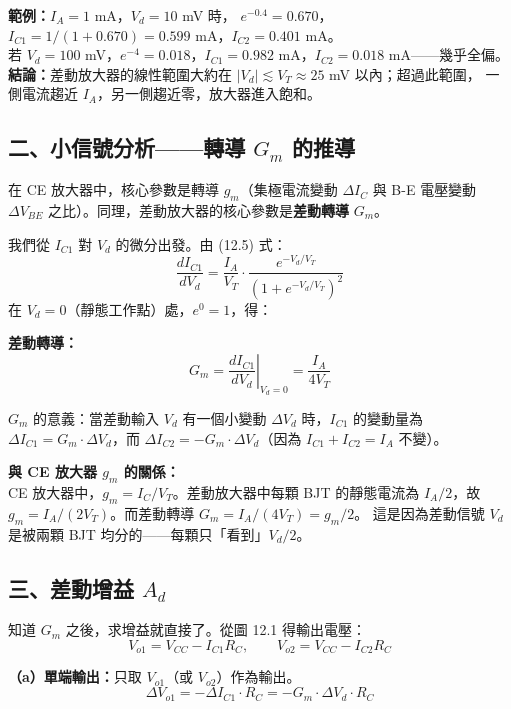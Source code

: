 \documentclass[12pt]{article}
\begin{document}
\noindent\textbf{範例：}$I_A = 1$ mA，$V_d = 10$ mV 時，
$e^{-0.4} = 0.670$，$I_{C1} = 1/(1+0.670) = 0.599$ mA，$I_{C2} = 0.401$ mA。\\
若 $V_d = 100$ mV，$e^{-4} = 0.018$，$I_{C1} = 0.982$ mA，$I_{C2} = 0.018$ mA——幾乎全偏。\\[4pt]
\textbf{結論：}差動放大器的線性範圍大約在 $|V_d| \lesssim V_T \approx 25$ mV 以內；超過此範圍，
一側電流趨近 $I_A$，另一側趨近零，放大器進入飽和。

\subsection*{二、小信號分析——轉導 $G_m$ 的推導}

\begin{keybox}[從轉導看差動放大器]
在 CE 放大器中，核心參數是轉導 $g_m$（集極電流變動 $\Delta I_C$ 與 B-E 電壓變動
$\Delta V_{BE}$ 之比）。同理，差動放大器的核心參數是\textbf{差動轉導} $G_m$。

我們從 $I_{C1}$ 對 $V_d$ 的微分出發。由 (12.5) 式：
\[
  \frac{dI_{C1}}{dV_d} = \frac{I_A}{V_T}\cdot\frac{e^{-V_d/V_T}}{(1+e^{-V_d/V_T})^2}
\]
在 $V_d = 0$（靜態工作點）處，$e^0 = 1$，得：
\end{keybox}

\begin{formulabox}
\textbf{差動轉導：}
\[
  G_m = \left.\frac{dI_{C1}}{dV_d}\right|_{V_d=0}
      = \frac{I_A}{4V_T} \tag{12.8}
\]
\end{formulabox}

\noindent
$G_m$ 的意義：當差動輸入 $V_d$ 有一個小變動 $\Delta V_d$ 時，$I_{C1}$ 的變動量為
$\Delta I_{C1} = G_m \cdot \Delta V_d$，而 $\Delta I_{C2} = -G_m \cdot \Delta V_d$（因為 $I_{C1}+I_{C2}=I_A$ 不變）。

\medskip
\noindent\textbf{與 CE 放大器 $g_m$ 的關係：}\\
CE 放大器中，$g_m = I_C / V_T$。差動放大器中每顆 BJT 的靜態電流為 $I_A/2$，故
$g_m = I_A/(2V_T)$。而差動轉導 $G_m = I_A/(4V_T) = g_m/2$。
這是因為差動信號 $V_d$ 是被兩顆 BJT 均分的——每顆只「看到」$V_d/2$。

\subsection*{三、差動增益 $A_d$}

\begin{keybox}[單端與雙端差動增益]
知道 $G_m$ 之後，求增益就直接了。從圖 12.1 得輸出電壓：
\[
  V_{o1} = V_{CC} - I_{C1}R_C, \qquad V_{o2} = V_{CC} - I_{C2}R_C
\]

\textbf{（a）單端輸出：}只取 $V_{o1}$（或 $V_{o2}$）作為輸出。
\[
  \Delta V_{o1} = -\Delta I_{C1}\cdot R_C = -G_m \cdot \Delta V_d \cdot R_C
\]
\end{keybox}
\end{document}
